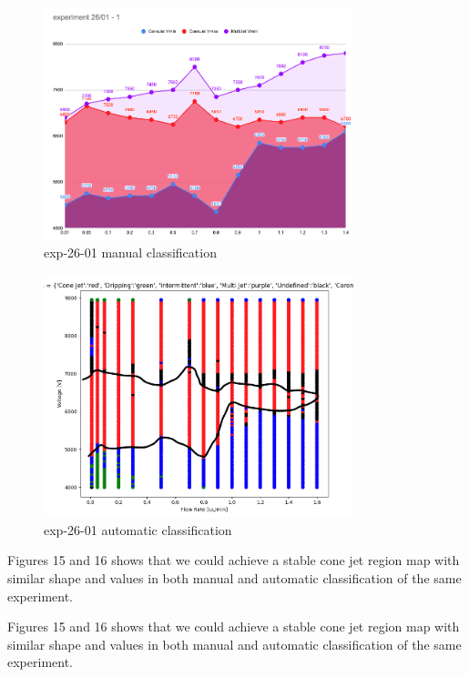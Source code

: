         \begin{multicols}{2}


            \begin{figure}[H]
                \center
                \includegraphics[width=9cm]{Figuras/report3/manual-mapping.png}
                \caption{ exp-26-01 manual classification}
            \end{figure}

            \begin{figure}[H]
                \center
                \includegraphics[width=9cm]{Figuras/report3/map4-stabilityIsland.png}
                \caption{ exp-26-01 automatic classification}
            \end{figure}

        \end{multicols}

        Figures 15 and 16 shows that we could achieve a stable cone jet region map with similar shape and values in both manual and automatic classification of the same experiment.

        Figures 15 and 16 shows that we could achieve a stable cone jet region map with similar shape and values in both manual and automatic classification of the same experiment.


